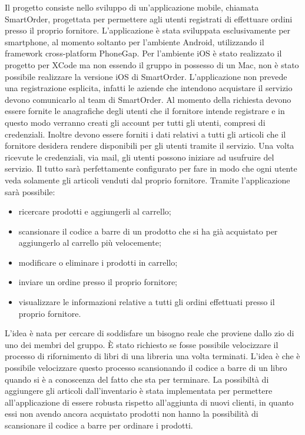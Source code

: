 \documentclass[12pt, a4paper, titlepage]{report}
\begin{document}
	Il progetto consiste nello sviluppo di un'applicazione mobile, chiamata SmartOrder, progettata per permettere agli utenti registrati di effettuare ordini presso il proprio fornitore. L'applicazione è stata sviluppata esclusivamente per smartphone, al momento soltanto per l'ambiente Android, utilizzando il framework cross-platform PhoneGap. Per l'ambiente iOS è stato realizzato il progetto per XCode ma non essendo il gruppo in possesso di un Mac, non è stato possibile realizzare la versione iOS di SmartOrder. L'applicazione non prevede una registrazione esplicita, infatti le aziende che intendono acquistare il servizio devono comunicarlo al team di SmartOrder. Al momento della richiesta devono essere fornite le anagrafiche degli utenti che il fornitore intende registrare e in questo modo verranno creati gli account per tutti gli utenti, compresi di credenziali. Inoltre devono essere forniti i dati relativi a tutti gli articoli che il fornitore desidera rendere disponibili per gli utenti tramite il servizio. Una volta ricevute le credenziali, via mail, gli utenti possono iniziare ad usufruire del servizio. Il tutto sarà perfettamente configurato per fare in modo che ogni utente veda solamente gli articoli venduti dal proprio fornitore. Tramite l'applicazione sarà possibile:
	\begin{itemize}
		\item ricercare prodotti e aggiungerli al carrello;
		\item scansionare il codice a barre di un prodotto che si ha già acquistato per aggiungerlo al carrello più velocemente;
		\item modificare o eliminare i prodotti in carrello;
		\item inviare un ordine presso il proprio fornitore;
		\item visualizzare le informazioni relative a tutti gli ordini effettuati presso il proprio fornitore.
	\end{itemize}
	L'idea è nata per cercare di soddisfare un bisogno reale che proviene dallo zio di uno dei membri del gruppo. È stato richiesto se fosse possibile velocizzare il processo di rifornimento di libri di una libreria una volta terminati. L'idea è che è possibile velocizzare questo processo scansionando il codice a barre di un libro quando si è a conoscenza del fatto che sta per terminare. La possibiltà di aggiungere gli articoli dall'inventario è stata implementata per permettere all'applicazione di essere robusta rispetto all'aggiunta di nuovi clienti, in quanto essi non avendo ancora acquistato prodotti non hanno la possibilità di scansionare il codice a barre per ordinare i prodotti.
	
\end{document}
